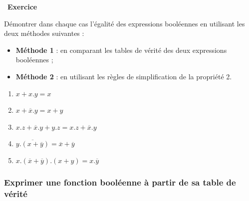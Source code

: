 \documentclass[
  11pt,
]{article}
\providecommand{\tightlist}{%
  \setlength{\itemsep}{0pt}\setlength{\parskip}{0pt}}
\newcounter{exo}
\newenvironment{exercice}[1]
{\par \medskip   \addtocounter{exo}{1} \noindent  
\begin{bclogo}[arrondi =0.1,   noborder = true, logo=\bccrayon, marge=4]{~\textbf{Exercice} \textbf{\theexo} {\itshape #1} }  \par}
{
\end{bclogo}
 \par \bigskip }
\newcounter{prop}
\newcounter{def}
\begin{document}
\begin{exercice}{}

Démontrer dans chaque cas l'égalité des expressions booléennes en
utilisant les deux méthodes suivantes :

\begin{itemize}
\item
  \textbf{Méthode 1} : en comparant les tables de vérité des deux
  expressions booléennes ;
\item
  \textbf{Méthode 2} : en utilisant les règles de simplification de la
  propriété 2.
\end{itemize}

\begin{enumerate}
\def\labelenumi{\arabic{enumi}.}
\tightlist
\item
  \(x + x . y = x\)
\item
  \(x + \overline{x} . y= x + y\)
\item
  \(x . z + \overline{x} . y + y . z = x . z + \overline{x} . y\)
\item
  \(\overline{y . (x + \overline{y})} = \overline{x} + \overline{y}\)
\item
  \(x . ( \overline{x} + \overline{y}) . (x + y) = x . \overline{y}\)
\end{enumerate}

\end{exercice}

\hypertarget{exprimer-une-fonction-booluxe9enne-uxe0-partir-de-sa-table-de-vuxe9rituxe9}{%
\subsubsection{Exprimer une fonction booléenne à partir de sa table de
vérité}\label{exprimer-une-fonction-booluxe9enne-uxe0-partir-de-sa-table-de-vuxe9rituxe9}}
\end{document}
